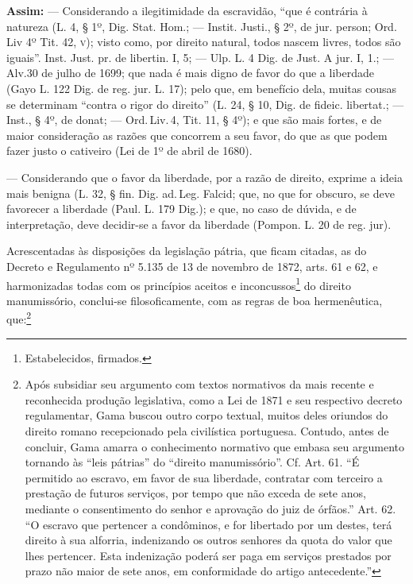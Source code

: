 {\noindent\textbf{Assim:}
--- Considerando a ilegitimidade da escravidão, ``que é contrária à
natureza (L. 4, § 1º, Dig. Stat. Hom.; --- Instit. Justi., § 2º, de jur.
person; Ord.\,Liv 4º Tit. 42, \textsc{v}); visto como, por direito natural, todos
nascem livres, todos são iguais''. Inst. Just. pr. de libertin. I, 5; ---
Ulp. L. 4 Dig. de Just. A jur. I, 1.; --- Alv.30 de julho de 1699; que nada é
mais digno de favor do que a liberdade (Gayo L. 122 Dig. de reg. jur. L.
17); pelo que, em benefício dela, muitas cousas se determinam ``contra o
rigor do direito'' (L. 24, § 10, Dig. de fideic. libertat.; --- Inst., §
4º, de donat; --- Ord.\,Liv.\,4, Tit. 11, § 4º); e que são mais fortes, e de
maior consideração as razões que concorrem a seu favor, do que as que
podem fazer justo o cativeiro (Lei de 1º de abril de 1680).

--- Considerando que o favor da liberdade, por a razão de direito,
exprime a ideia mais benigna (L. 32, § fin. Dig. ad.\,Leg. Falcid; que,
no que for obscuro, se deve favorecer a liberdade (Paul. L. 179 Dig.); e
que, no caso de dúvida, e de interpretação, deve decidir-se a favor da
liberdade (Pompon. L. 20 de reg. jur).

Acrescentadas às disposições da legislação pátria, que ficam citadas, as
do Decreto e Regulamento nº 5.135 de 13 de novembro de 1872, arts. 61 e
62, e harmonizadas todas com os princípios aceitos e
inconcussos\footnote{Estabelecidos, firmados.} do direito
manumissório, conclui-se filosoficamente, com as regras de boa
hermenêutica, que:\footnote{Após subsidiar seu argumento com textos
  normativos da mais recente e reconhecida produção legislativa, como a
  Lei de 1871 e seu respectivo decreto regulamentar, Gama buscou outro
  corpo textual, muitos deles oriundos do direito romano recepcionado
  pela civilística portuguesa. Contudo, antes de concluir, Gama amarra o
  conhecimento normativo que embasa seu argumento tornando às ``leis
  pátrias'' do ``direito manumissório''. Cf. Art. 61. ``É permitido ao
  escravo, em favor de sua liberdade, contratar com terceiro a prestação
  de futuros serviços, por tempo que não exceda de sete anos, mediante o
  consentimento do senhor e aprovação do juiz de órfãos.'' Art. 62. ``O
  escravo que pertencer a condôminos, e for libertado por um destes,
  terá direito à sua alforria, indenizando os outros senhores da quota
  do valor que lhes pertencer. Esta indenização poderá ser paga em
  serviços prestados por prazo não maior de sete anos, em conformidade
  do artigo antecedente.''}

}
